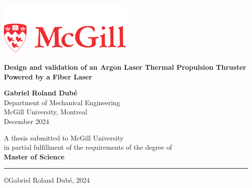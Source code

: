 \begin{titlepage}
  \thispagestyle{empty}
  \sffamily
  \begin{center}
    \includegraphics[width=0.5\textwidth]{assets/McGill_logo.pdf} \\
    \vspace*{2cm}
    
    \huge
    \textbf{Design and validation of an Argon Laser Thermal Propulsion Thruster Powered by a Fiber Laser}
    
    \large

    
    \vspace{1.5cm}    
    \textbf{Gabriel Roland Dubé}\\

    
    \vspace{0.5cm}
    Department of Mechanical Engineering\\
    McGill University, Montreal\\

    \vspace{1.5cm}
    December 2024\\
    \vspace{1.5cm}
    
    A thesis submitted to McGill University \\
    in partial fulfillment of the requirements of the degree of\\
    \textbf{Master of Science}\\
    
    \vfill

    {\color{red}\hrule}

    \copyright Gabriel Roland Dubé, 2024
            
  \end{center}
\end{titlepage}